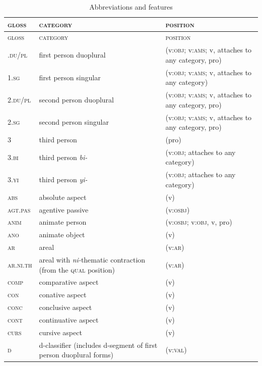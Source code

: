 \begin{xltabular}{\textwidth}{lXX}
\caption{Abbreviations and features} \label{tab:abbrevfeat}\\

    \lsptoprule
        \textsc{gloss} & \textsc{category} & \textsc{position}\\
    \midrule
    \endfirsthead
    \toprule
        \textsc{gloss} & \textsc{category} & \textsc{position}\\
	\midrule
    \endhead

    \endfoot  
    .\textsc{du}/\textsc{pl} & first person duoplural & (v:\textsc{obj}; v:\textsc{ams}; v, attaches to any category, pro)\\
1.\textsc{sg} & first person singular & (v:\textsc{obj}; v:\textsc{ams}; v, attaches to any category)\\
2.\textsc{du}/\textsc{pl} & second person duoplural & (v:\textsc{obj}; v:\textsc{ams}; v, attaches to any category, pro)\\
2.\textsc{sg} & second person singular & (v:\textsc{obj}; v:\textsc{ams}; v, attaches to any category, pro)\\
3 & third person & (pro)\\
3.\textsc{bi} & third person \textit{bi-} & (v:\textsc{obj}; attaches to any category)\\
3.\textsc{yi} & third person \textit{yi-} & (v:\textsc{obj}; attaches to any category)\\
\textsc{abs} & absolute aspect & (v)\\
\textsc{agt}.\textsc{pas} & agentive passive & (v:\textsc{osbj})\\
\textsc{anim} & animate person & (v:\textsc{osbj}; v:\textsc{obj}, v, pro)\\
\textsc{ano} & animate object & (v)\\
\textsc{ar} & areal & (v:\textsc{ar})\\
\textsc{ar}.\textsc{ni}.\textsc{th} & areal with \textit{ni-}thematic contraction (from the \textsc{qual} position) & (v:\textsc{ar})\\
\textsc{comp} & comparative aspect & (v)\\
\textsc{con} & conative aspect & (v)\\
\textsc{conc} & conclusive aspect & (v)\\
\textsc{cont} & continuative aspect & (v)\\
\textsc{curs} & cursive aspect & (v)\\
\textsc{d} & d-classifier (includes \mbox{d-segment} of first person duoplural forms) & (v:\textsc{val})\\

\end{xltabular}
